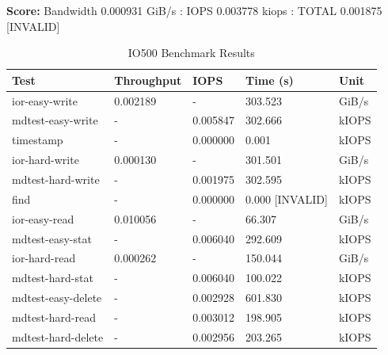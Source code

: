 \documentclass[article,a4paper,12pt,brazil,sumario=tradicional]{abntex2}
\begin{document}
\textbf{Score:} Bandwidth 0.000931 GiB/s : IOPS 0.003778 kiops : TOTAL 0.001875 [INVALID]

\begin{table}[htb]
	\centering
	\begin{tabular}{|l|l|l|l|l|}
		\hline
		\rowcolor[HTML]{EFEFEF}
		\textbf{Test}          & \textbf{Throughput}        & \textbf{IOPS}         & \textbf{Time (s)} & \textbf{Unit} \\ \hline
		ior-easy-write         & 0.002189                    & -                    & 303.523           & GiB/s         \\ \hline
		mdtest-easy-write      & -                          & 0.005847             & 302.666           & kIOPS         \\ \hline
		timestamp              & -                          & 0.000000             & 0.001             & kIOPS         \\ \hline
		ior-hard-write         & 0.000130                    & -                    & 301.501           & GiB/s         \\ \hline
		mdtest-hard-write      & -                          & 0.001975             & 302.595           & kIOPS         \\ \hline
		find                   & -                          & 0.000000             & 0.000 [INVALID]   & kIOPS         \\ \hline
		ior-easy-read          & 0.010056                    & -                    & 66.307            & GiB/s         \\ \hline
		mdtest-easy-stat       & -                          & 0.006040             & 292.609           & kIOPS         \\ \hline
		ior-hard-read          & 0.000262                    & -                    & 150.044           & GiB/s         \\ \hline
		mdtest-hard-stat       & -                          & 0.006040             & 100.022           & kIOPS         \\ \hline
		mdtest-easy-delete     & -                          & 0.002928             & 601.830           & kIOPS         \\ \hline
		mdtest-hard-read       & -                          & 0.003012             & 198.905           & kIOPS         \\ \hline
		mdtest-hard-delete     & -                          & 0.002956             & 203.265           & kIOPS         \\ \hline
	\end{tabular}
	\caption{IO500 Benchmark Results}
	\label{tab:io500-results}
\end{table}
\end{document}
